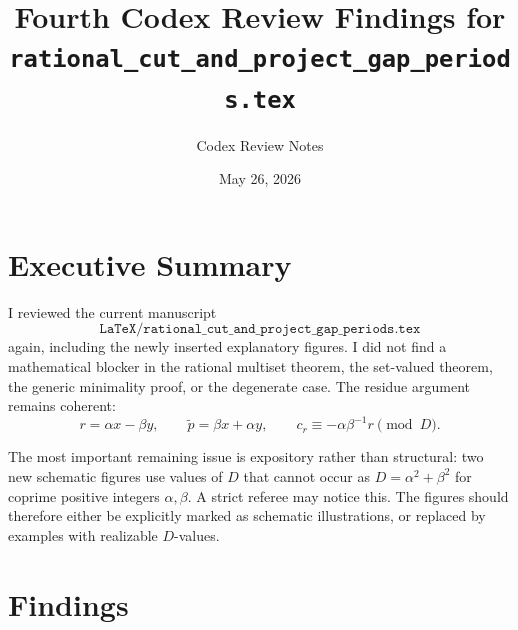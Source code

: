 \documentclass[11pt]{article}
\title{Fourth Codex Review Findings for\\
\texttt{rational\_cut\_and\_project\_gap\_periods.tex}}
\author{Codex Review Notes}
\date{May 26, 2026}
\begin{document}
\maketitle

\section*{Executive Summary}

I reviewed the current manuscript
\[
\texttt{LaTeX/rational\_cut\_and\_project\_gap\_periods.tex}
\]
again, including the newly inserted explanatory figures.  I did not find a
mathematical blocker in the rational multiset theorem, the set-valued theorem,
the generic minimality proof, or the degenerate case.  The residue argument
remains coherent:
\[
r=\alpha x-\beta y,\qquad
\tilde p=\beta x+\alpha y,\qquad
c_r\equiv -\alpha\beta^{-1}r \pmod D.
\]

The most important remaining issue is expository rather than structural:
two new schematic figures use values of \(D\) that cannot occur as
\(D=\alpha^2+\beta^2\) for coprime positive integers \(\alpha,\beta\).
A strict referee may notice this.  The figures should therefore either be
explicitly marked as schematic illustrations, or replaced by examples with
realizable \(D\)-values.

\section*{Findings}
\end{document}

